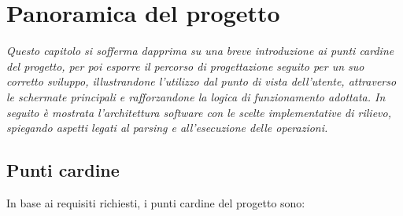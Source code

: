 \chapter{Panoramica del progetto}
\begin{minipage}{12cm}\textit{Questo capitolo si sofferma dapprima su una breve introduzione ai punti cardine del progetto, per poi esporre il percorso di progettazione seguito per un suo corretto sviluppo, illustrandone l'utilizzo dal punto di vista dell'utente,  attraverso le schermate principali e rafforzandone la logica di funzionamento adottata. In seguito \`e mostrata l'architettura software con le scelte implementative di rilievo, spiegando aspetti legati al parsing e all'esecuzione delle operazioni.}
\end{minipage}

\vspace*{1cm}
\section{Punti cardine}
In base ai requisiti richiesti, i punti cardine del progetto sono:

\vspace*{0.5cm}
